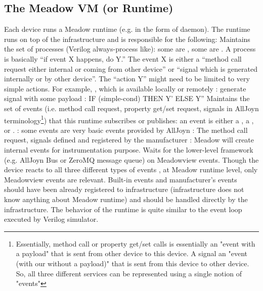 \documentclass{note}
\begin{document}
\subsection{The Meadow VM (or Runtime)}
Each device runs a Meadow runtime (e.g. in the form 
    of daemon).  The runtime runs on top of the infrastructure and 
    is responsible for the following:
   \bit
   \w Maintains the set of processes (Verilog always-process like):
      some are , some are 
      . 
       \bit
       \w A process is basically ``if event X happens, do Y.'' 
        The event X is either a ``method call request either internal or
        coming from other device'' or ``signal which is generated internally
        or by other device''.
       \w The ``action Y''  might need to be limited to very simple
       actions. For example,  
          \bit
          \w {}, which is available locally or remotely 
          \w {}: generate signal with some payload
          \w {}: IF (simple-cond) THEN Y' ELSE Y''
          \eit
        \eit
   \w Maintains the set of events (i.e. method call request, 
      property get/set request, signals in AllJoyn 
      terminology\footnote{Essentially, method call or property 
      get/set calls is essentially an "event with a payload" that is sent from
other device to this device. A signal an "event (with our without a payload)"
that is sent from this device to other device.  So, all three different
services can be represented using a single notion of "events"}) that 
this runtime subscribes or publishes: an event is either a , a , or .
       \bit
       \w {}: some events are very basic events provided by
       AllJoyn 
       \w {}: The method call request, signals defined
       and registered by the manufacturer
       \w {}: Meadow will create internal events for
       instrumentation purpose.
       \eit
   \w Waits for the lower-level framework (e.g. AllJoyn Bus or 
      ZeroMQ message queue) on Meadowview events.
      \bit
      \w Though the device reacts to all three different types of events ,
       at Meadow runtime level, only Meadowview events are relevant.
       Built-in events and manufacturer's events should have been already
       registered to infrastructure (infrastructure does not know anything
       about Meadow 
       runtime) and should be handled directly by the infrastructure.
   \w The behavior of the runtime is quite similar to the event loop 
       executed by Verilog simulator.
   \eit
   \eit
\end{document}
